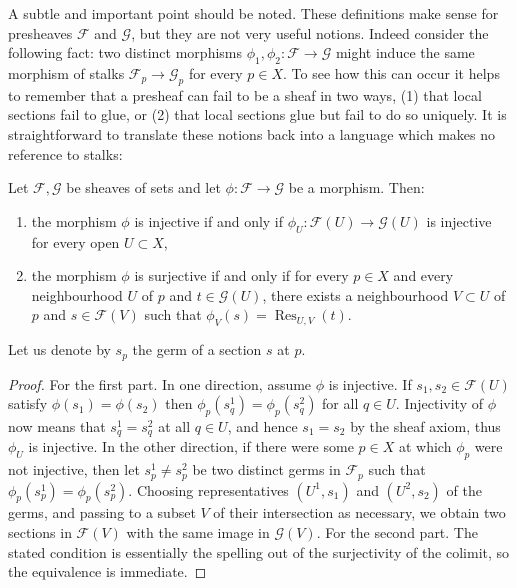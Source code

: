 A subtle and important point should be noted. These definitions make sense for presheaves $\mathcal F$
and $\mathcal G$, but they are not very useful notions. Indeed consider the following fact: two distinct
morphisms $\phi_1,\phi_2:\mathcal F\to\mathcal G$ might induce the same morphism of stalks
$\mathcal F_p\to\mathcal G_p$ for every $p\in X$. To see how this can occur it helps to remember that a presheaf can fail to be a sheaf
in two ways, (1) that local sections fail to glue, or (2) that local sections glue but fail to do
so uniquely.
It is straightforward to translate these notions back into a language which makes no reference
to stalks:

\begin{proposition}
Let $\mathcal F,\mathcal G$ be sheaves of sets and let $\phi:\mathcal F\to\mathcal G$ be a morphism. Then:
\begin{enumerate}
\item the morphism $\phi$ is injective if and only if
$\phi_U:\mathcal F(U)\to\mathcal G(U)$ is injective for every open $U\subset X$,
\item the morphism $\phi$ is surjective if and only if for every $p\in X$ and every neighbourhood
$U$ of $p$ and $t\in\mathcal G(U)$, there exists a neighbourhood $V\subset U$ of $p$ and
$s\in\mathcal F(V)$ such that $\phi_V(s)=\operatorname{Res}_{U,V}(t)$.
\end{enumerate}
\end{proposition}

Let us denote by $s_p$ the germ of a section $s$ at $p$.

\begin{proof}
For the first part. In one direction, assume $\phi$ is injective. If $s_1,s_2\in\mathcal F(U)$ satisfy
$\phi(s_1)=\phi(s_2)$ then $\phi_p(s^1_q)=\phi_p(s^2_q)$ for all $q\in U$. Injectivity of $\phi$ now means that
$s^1_q=s^2_q$ at all $q\in U$, and hence $s_1=s_2$ by the sheaf axiom, thus $\phi_U$ is injective. In the other direction,
if there were some $p\in X$ at which $\phi_p$ were not injective, then let $s^1_p\neq s^2_p$ be two distinct
germs in $\mathcal F_p$ such that $\phi_p(s^1_p)=\phi_p(s^2_p)$. Choosing representatives $(U^1,s_1)$ and $(U^2,s_2)$ of the
germs, and passing to a subset $V$ of their intersection as necessary, we obtain two sections
in $\mathcal F(V)$ with the same image in $\mathcal G(V)$.
For the second part. The stated condition is essentially the spelling out of the surjectivity
of the colimit, so the equivalence is immediate.
\end{proof}

